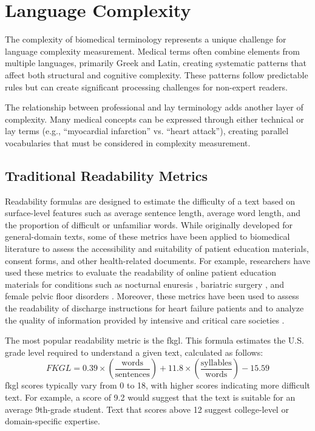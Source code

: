 \section{Language Complexity}
\label{c2:s:linguistic-complexity}

The complexity of biomedical terminology represents a unique challenge for language complexity measurement. 
Medical terms often combine elements from multiple languages, primarily Greek and Latin, creating systematic patterns that affect both structural and cognitive complexity. 
These patterns follow predictable rules but can create significant processing challenges for non-expert readers.

The relationship between professional and lay terminology adds another layer of complexity. 
Many medical concepts can be expressed through either technical or lay terms (e.g., ``myocardial infarction'' vs. ``heart attack''), creating parallel vocabularies that must be considered in complexity measurement. 

\subsection{Traditional Readability Metrics}

Readability formulas are designed to estimate the difficulty of a text based on surface-level features such as average sentence length, average word length, and the proportion of difficult or unfamiliar words. While originally developed for general-domain texts, some of these metrics have been applied to biomedical literature to assess the accessibility and suitability of patient education materials, consent forms, and other health-related documents. For example, researchers have used these metrics to evaluate the readability of online patient education materials for conditions such as nocturnal enuresis \cite{Fung2024-uh}, bariatric surgery \cite{Lucy2023-zi}, and female pelvic floor disorders \cite{Varli2023-ma}. Moreover, these metrics have been used to assess the readability of discharge instructions for heart failure patients \cite{Tuan2023-wc} and to analyze the quality of information provided by intensive and critical care societies \cite{Hanci2024-wv}.

The most popular readability metric is the \gls{fkgl}. This formula estimates the U.S. grade level required to understand a given text, calculated as follows:
\begin{equation}
    \label{eq:fkgl}
    FKGL = 0.39 \times \left(\frac{\text{words}}{\text{sentences}}\right) + 11.8 \times \left(\frac{\text{syllables}}{\text{words}}\right) - 15.59
\end{equation}
\gls{fkgl} scores typically vary from 0 to 18, with higher scores indicating more difficult text. For example, a score of 9.2 would suggest that the text is suitable for an average 9th-grade student. Text that scores above 12 suggest college-level or domain-specific expertise.

